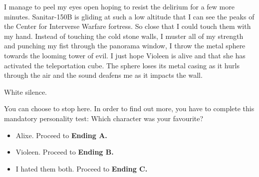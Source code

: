 \hsep

I manage to peel my eyes open hoping to resist the delirium for a few
more minutes. Sanitar-150B is gliding at such a low altitude that I
can see the peaks of the Center for Interverse Warfare fortress. So
close that I could touch them with my hand. Instead of touching the
cold stone walls, I muster all of my strength and punching my fist
through the panorama window, I throw the metal sphere towards the
looming tower of evil. I just hope Violeen is alive and that she has
activated the teleportation cube. The sphere loses its metal casing as
it hurls through the air and the sound deafens me as it impacts the
wall.

White silence.

\hsep

\begin{flashback}
You can choose to stop here. In order to find out more, you have to complete this mandatory personality test:
Which character was your favourite?

\begin{itemize} \itemsep-0.5em
\item {\normalfont Alixe.} Proceed to \textbf{Ending A.}
\item {\normalfont Violeen.} Proceed to \textbf{Ending B.}
\item {\normalfont I hated them both.} Proceed to \textbf{Ending C.}
\end{itemize}
\end{flashback}

\hsep



